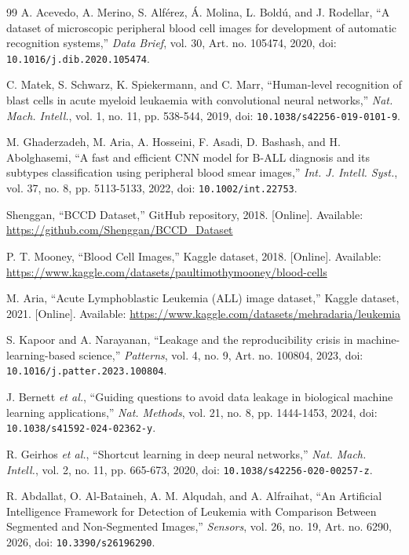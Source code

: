 \begin{thebibliography}{99}
 A. Acevedo, A. Merino, S. Alférez, Á. Molina, L. Boldú, and J. Rodellar, ``A dataset of microscopic peripheral blood cell images for development of automatic recognition systems,'' \emph{Data Brief}, vol. 30, Art. no. 105474, 2020, doi: \nolinkurl{10.1016/j.dib.2020.105474}.

 C. Matek, S. Schwarz, K. Spiekermann, and C. Marr, ``Human-level recognition of blast cells in acute myeloid leukaemia with convolutional neural networks,'' \emph{Nat. Mach. Intell.}, vol. 1, no. 11, pp. 538-544, 2019, doi: \nolinkurl{10.1038/s42256-019-0101-9}.

 M. Ghaderzadeh, M. Aria, A. Hosseini, F. Asadi, D. Bashash, and H. Abolghasemi, ``A fast and efficient CNN model for B-ALL diagnosis and its subtypes classification using peripheral blood smear images,'' \emph{Int. J. Intell. Syst.}, vol. 37, no. 8, pp. 5113-5133, 2022, doi: \nolinkurl{10.1002/int.22753}.

 Shenggan, ``BCCD Dataset,'' GitHub repository, 2018. [Online]. Available: \url{https://github.com/Shenggan/BCCD_Dataset}

 P. T. Mooney, ``Blood Cell Images,'' Kaggle dataset, 2018. [Online]. Available: \url{https://www.kaggle.com/datasets/paultimothymooney/blood-cells}

 M. Aria, ``Acute Lymphoblastic Leukemia (ALL) image dataset,'' Kaggle dataset, 2021. [Online]. Available: \url{https://www.kaggle.com/datasets/mehradaria/leukemia}

 S. Kapoor and A. Narayanan, ``Leakage and the reproducibility crisis in machine-learning-based science,'' \emph{Patterns}, vol. 4, no. 9, Art. no. 100804, 2023, doi: \nolinkurl{10.1016/j.patter.2023.100804}.

 J. Bernett \emph{et al.}, ``Guiding questions to avoid data leakage in biological machine learning applications,'' \emph{Nat. Methods}, vol. 21, no. 8, pp. 1444-1453, 2024, doi: \nolinkurl{10.1038/s41592-024-02362-y}.

 R. Geirhos \emph{et al.}, ``Shortcut learning in deep neural networks,'' \emph{Nat. Mach. Intell.}, vol. 2, no. 11, pp. 665-673, 2020, doi: \nolinkurl{10.1038/s42256-020-00257-z}.

 R. Abdallat, O. Al-Bataineh, A. M. Alqudah, and A. Alfraihat, ``An Artificial Intelligence Framework for Detection of Leukemia with Comparison Between Segmented and Non-Segmented Images,'' \emph{Sensors}, vol. 26, no. 19, Art. no. 6290, 2026, doi: \nolinkurl{10.3390/s26196290}.


\end{thebibliography}

